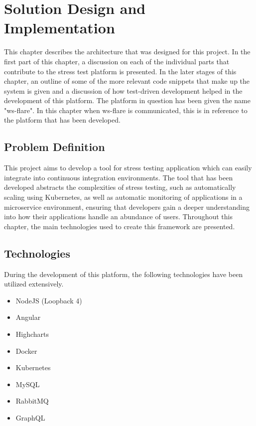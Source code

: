 \chapter{Solution Design and Implementation}

This chapter describes the architecture that was designed for this project. In the first part of this chapter, a discussion on each of the individual parts that contribute to the stress test platform is presented. In the later stages of this chapter, an outline of some of the more relevant code snippets that make up the system is given and a discussion of how test-driven development helped in the development of this platform. The platform in question has been given the name "ws-flare". In this chapter when ws-flare is communicated, this is in reference to the platform that has been developed.

\section{Problem Definition}

This project aims to develop a tool for stress testing application which can easily integrate into continuous integration environments. The tool that has been developed abstracts the complexities of stress testing, such as automatically scaling using Kubernetes, as well as automatic monitoring of applications in a microservice environment, ensuring that developers gain a deeper understanding into how their applications handle an abundance of users. Throughout this chapter, the main technologies used to create this framework are presented.

\section{Technologies}

During the development of this platform, the following technologies have been utilized extensively.

\begin{itemize}
  \item NodeJS (Loopback 4)
  \item Angular
  \item Highcharts
  \item Docker
  \item Kubernetes
  \item MySQL
  \item RabbitMQ
  \item GraphQL
\end{itemize}


